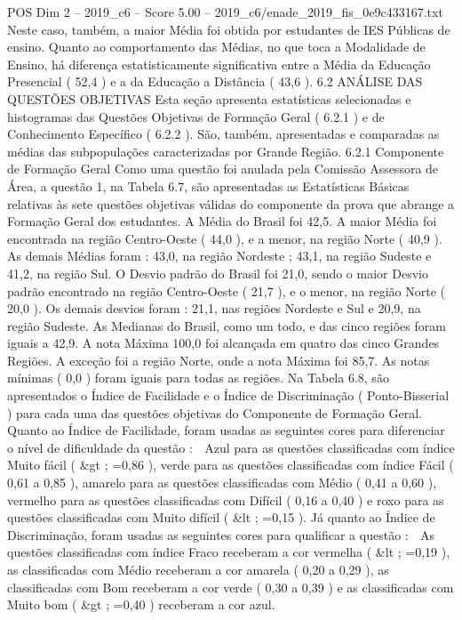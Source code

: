 \begin{textsample}{POS Dim 2 – 2019\_c6 – Score 5.00 – 2019\_c6/enade\_2019\_fis\_0e9c433167.txt}
Neste caso, também, a maior Média foi obtida por estudantes de IES Públicas de ensino.
Quanto ao comportamento das Médias, no que toca a Modalidade de Ensino, há diferença estatisticamente significativa entre a Média da Educação Presencial ( 52,4 ) e a da Educação a Distância ( 43,6 ). 6.2 ANÁLISE DAS QUESTÕES OBJETIVAS Esta seção apresenta estatísticas selecionadas e histogramas das Questões Objetivas de Formação Geral ( 6.2.1 ) e de Conhecimento Específico ( 6.2.2 ).
São, também, apresentadas e comparadas as médias das subpopulações caracterizadas por Grande Região. 6.2.1 Componente de Formação Geral Como uma questão foi anulada pela Comissão Assessora de Área, a questão 1, na Tabela 6.7, são apresentadas as Estatísticas Básicas relativas às sete questões objetivas válidas do componente da prova que abrange a Formação Geral dos estudantes.
A Média do Brasil foi 42,5.
A maior Média foi encontrada na região Centro-Oeste ( 44,0 ), e a menor, na região Norte ( 40,9 ).
As demais Médias foram : 43,0, na região Nordeste ; 43,1, na região Sudeste e 41,2, na região Sul.
O Desvio padrão do Brasil foi 21,0, sendo o maior Desvio padrão encontrado na região Centro-Oeste ( 21,7 ), e o menor, na região Norte ( 20,0 ).
Os demais desvios foram : 21,1, nas regiões Nordeste e Sul e 20,9, na região Sudeste.
As Medianas do Brasil, como um todo, e das cinco regiões foram iguais a 42,9.
A nota Máxima 100,0 foi alcançada em quatro das cinco Grandes Regiões.
A exceção foi a região Norte, onde a nota Máxima foi 85,7.
As notas mínimas ( 0,0 ) foram iguais para todas as regiões.
Na Tabela 6.8, são apresentados o Índice de Facilidade e o Índice de Discriminação ( Ponto-Bisserial ) para cada uma das questões objetivas do Componente de Formação Geral.
Quanto ao Índice de Facilidade, foram usadas as seguintes cores para diferenciar o nível de dificuldade da questão :  Azul para as questões classificadas com índice Muito fácil ( \&gt ; =0,86 ), verde para as questões classificadas com índice Fácil ( 0,61 a 0,85 ), amarelo para as questões classificadas com Médio ( 0,41 a 0,60 ), vermelho para as questões classificadas com Difícil ( 0,16 a 0,40 ) e roxo para as questões classificadas com Muito difícil ( \&lt ; =0,15 ).
Já quanto ao Índice de Discriminação, foram usadas as seguintes cores para qualificar a questão :  As questões classificadas com índice Fraco receberam a cor vermelha ( \&lt ; =0,19 ), as classificadas com Médio receberam a cor amarela ( 0,20 a 0,29 ), as classificadas com Bom receberam a cor verde ( 0,30 a 0,39 ) e as classificadas com Muito bom ( \&gt ; =0,40 ) receberam a cor azul.

\end{textsample}

